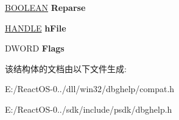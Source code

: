 \begin{DoxyCompactItemize}
\mbox{\label{struct___i_m_a_g_e_h_l_p___d_e_f_e_r_r_e_d___s_y_m_b_o_l___l_o_a_d64_a1582f35a40846b7c37290931436ef496}} 
\hyperlink{_processor_bind_8h_a112e3146cb38b6ee95e64d85842e380a}{B\+O\+O\+L\+E\+AN} {\bfseries Reparse}
\item 
\mbox{\label{struct___i_m_a_g_e_h_l_p___d_e_f_e_r_r_e_d___s_y_m_b_o_l___l_o_a_d64_afdbc060e1ad2ad19f3bad620d1d8ef59}} 
\hyperlink{interfacevoid}{H\+A\+N\+D\+LE} {\bfseries h\+File}
\item 
\mbox{\label{struct___i_m_a_g_e_h_l_p___d_e_f_e_r_r_e_d___s_y_m_b_o_l___l_o_a_d64_a276f27eaf02c780503c5408017400bc1}} 
D\+W\+O\+RD {\bfseries Flags}
\end{DoxyCompactItemize}


该结构体的文档由以下文件生成\+:\begin{DoxyCompactItemize}
\item 
E\+:/\+React\+O\+S-\/0../dll/win32/dbghelp/compat.\+h\item 
E\+:/\+React\+O\+S-\/0../sdk/include/psdk/dbghelp.\+h\end{DoxyCompactItemize}
